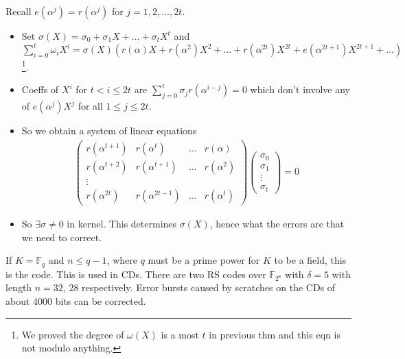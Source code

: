 Recall $e(\alpha^j) = r(\alpha^j)$ for $j = 1, 2, \dots, 2t$.
\begin{itemize}
    \item Set $\sigma(X) = \sigma_0 + \sigma_1 X + \dots + \sigma_t X^t$ and $\sum_{i=0}^{t} \omega_i X^i = \sigma(X)(r(\alpha) X + r(\alpha^2) X^2 + \dots + r(\alpha^{2t})X^{2t} + e(\alpha^{2t + 1}) X^{2t + 1} + \dots)$\footnote{We proved the degree of $\omega(X)$ is a most $t$ in previous thm and this eqn is not modulo anything.}.
    \item Coeffs of $X^i$ for $t < i \leq 2t$ are $\sum_{j=0}^t \sigma_j r(\alpha^{i-j}) = 0$ which don't involve any of $e(\alpha^j)X^j$ for all $1 \leq j \leq 2t$.
    \item So we obtain a system of linear equations
    \begin{align*}
        \begin{pmatrix}
        r(\alpha^{t+1}) & r(\alpha^t) & \dots & r(\alpha) \\
        r(\alpha^{t+2}) & r(\alpha^{t+1}) & \dots & r(\alpha^2) \\
        \vdots &  &  &  \\
        r(\alpha^{2t}) & r(\alpha^{2t-1}) & \dots & r(\alpha^{t})
        \end{pmatrix}
        \begin{pmatrix}\sigma_0 \\ \sigma_1 \\ \vdots\\ \sigma_t \end{pmatrix}
        = 0
    \end{align*}
    \item So $\exists \sigma \neq 0$ in kernel.
    This determines $\sigma(X)$, hence what the errors are that we need to correct.
\end{itemize}

\begin{example}
    If $K = \mathbb{F}_q$ and $n \leq q - 1$, where $q$ must be a prime power for $K$ to be a field, this is the  code.
    This is used in CDs.
    There are two RS codes over $\mathbb{F}_{2^8}$ with $\delta = 5$ with length $n = 32$, $28$ respectively.
    Error bursts caused by scratches on the CDs of about 4000 bits can be corrected.
\end{example}

